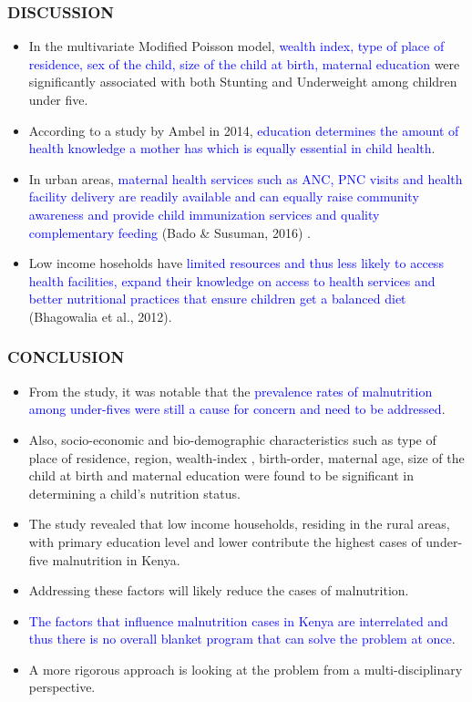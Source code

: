 	\begin{frame}
		\frametitle{DISCUSSION}
		\begin{itemize}
			\item In the multivariate Modified Poisson model, \textcolor {blue}{wealth index, type of place of residence, sex of the child, size of the child at birth, maternal education} were significantly associated with both Stunting and Underweight among children under five. 
			\item According to a study by Ambel in 2014, \textcolor {blue}{education determines the amount of health knowledge a mother has which is equally essential in child health}.  
			\item In urban areas, \textcolor {blue}{maternal health services such as ANC, PNC visits and health facility delivery are readily available and can equally raise community awareness and provide child immunization services and quality complementary feeding} (Bado \& Susuman, 2016) .
			\item Low income hoseholds have \textcolor {blue} {limited resources and thus less likely to access health facilities, expand their knowledge on access to health services and better nutritional practices that ensure children get a balanced diet} (Bhagowalia et al., 2012).  
		\end{itemize}
	\end{frame}
	\begin{frame}
		\frametitle{CONCLUSION}
		\begin{itemize}
			\item From the study, it was notable that the \textcolor {blue} {prevalence rates of malnutrition among under-fives were still a cause for concern and need to be addressed}. 
			\item Also, socio-economic  and bio-demographic characteristics such as type of place of residence, region, wealth-index , birth-order, maternal age, size of the child at birth and maternal education were found to be significant in determining a child’s nutrition status. 
			\item The study revealed that low income households, residing in the rural areas, with primary education level and lower contribute the highest cases of under-five malnutrition in Kenya. 
			\item Addressing these factors will likely reduce the cases of malnutrition. 
			\item \textcolor {blue} {The factors that influence malnutrition cases in Kenya are interrelated and thus there is no overall blanket program that can solve the problem at once}. 
			\item A more rigorous approach is looking at the problem from a multi-disciplinary perspective.
		\end{itemize}
	\end{frame}
